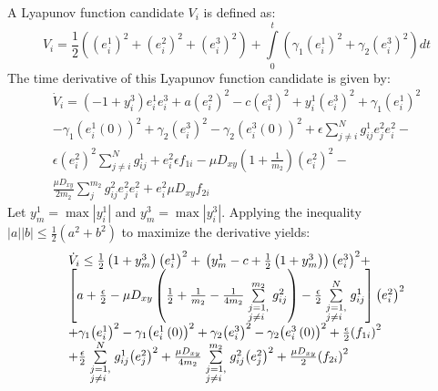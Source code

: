 \documentclass[10pt]{article}
\begin{document}
A Lyapunov function candidate $V_i$ is defined as:
$$
{V_i} = \frac{1}{2}\left( {{{\left( {e_i^1} \right)}^2} + {{\left( {e_i^2} \right)}^2} + {{\left( {e_i^3} \right)}^2}} \right) + \int\limits_0^t {\left( {{\gamma _1}{{\left( {e_i^1} \right)}^2} + {\gamma _2}{{\left( {e_i^3} \right)}^2}} \right)dt}
$$
The time derivative of this Lyapunov function candidate is given by:
$$
\begin{array}{l}
{{\dot V}_i} = \left( {-1 + y_i^3} \right)e_i^1e_i^3 + a{\left( {e_i^2} \right)^2} - c{\left( {e_i^3} \right)^2} + y_i^1{\left( {e_i^3} \right)^2} + {\gamma _1}{\left( {e_i^1} \right)^2}\\
 - {\gamma _1}{\left( {e_i^1\left( 0 \right)} \right)^2} + {\gamma _2}{\left( {e_i^3} \right)^2} - {\gamma _2}{\left( {e_i^3\left( 0 \right)} \right)^2} + \epsilon \sum\limits_{j \ne i}^N {g_{ij}^1e_j^2e_i^2}  - \\
\epsilon {\left( {e_i^2} \right)^2}\sum\limits_{j \ne i}^N {g_{ij}^1}  + e_i^2\epsilon {{f_{1i}}}  - \mu {D_{xy}}\left( {1 + \frac{1}{{{m_2}}}} \right){\left( {e_i^2} \right)^2} - \\
\frac{{\mu {D_{xy}}}}{{2{m_2}}}\sum\limits_j^{{m_2}} {g _{ij}^2e_j^2e_i^2}  + e_i^2\mu {D_{xy}}{f_{2i}}
\end{array}
$$
Let $y_m^1 = \max\left| {y_i^1} \right|$ and $y_m^3 = \max\left| {y_i^3} \right|$. Applying the inequality $\left| a \right|\left| b \right| \le \frac{1}{2}\left( {{a^2} + {b^2}} \right)$ to maximize the derivative yields:
$$
\begin{array}{l}
{{\dot V}_i} \le \frac{1}{2}\left( {1 + y_m^3} \right){\left( {e_i^1} \right)^2} + \,\left( {y_m^1 - c + \frac{1}{2}\left( {1 + y_m^3} \right)} \right){\left( {e_i^3} \right)^2} +\\
\left[ {a + \frac{\epsilon }{2} - \mu {D_{xy}}\left( {\frac{1}{2} + \frac{1}{{{m_2}}} - \frac{1}{{4{m_2}}}\sum\limits_{\scriptstyle j = 1,\hfill\atop \scriptstyle j \ne i\hfill}^{{m_2}} {g _{ij}^2} } \right) - \frac{\epsilon }{2}\sum\limits_{\scriptstyle j = 1,\hfill\atop \scriptstyle j \ne i\hfill}^N {g_{ij}^1} } \right]{\left( {e_i^2} \right)^2}\\
 + {\gamma _1}{\left( {e_i^1} \right)^2} - {\gamma _1}{\left( {e_i^1\left( 0 \right)} \right)^2} + {\gamma _2}{\left( {e_i^3} \right)^2} - {\gamma _2}{\left( {e_i^3\left( 0 \right)} \right)^2} + \frac{\epsilon }{2}{\left( {{f_{1i}}} \right)^2}\\
 + \frac{\epsilon }{2}\sum\limits_{\scriptstyle j = 1,\hfill\atop \scriptstyle j \ne i\hfill}^N {g_{ij}^1{{\left( {e_j^2} \right)}^2}}  + \frac{{\mu {D_{xy}}}}{{4{m_2}}}\sum\limits_{\scriptstyle j = 1,\hfill\atop \scriptstyle j \ne i\hfill}^{{m_2}} {g _{ij}^2{{\left( {e_j^2} \right)}^2}} + \frac{{\mu {D_{xy}}}}{2}{\left( {{f_{2i}}} \right)^2}
\end{array}
$$
\end{document}
